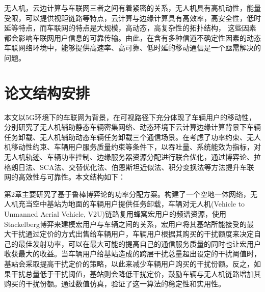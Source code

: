 \textcolor[RGB]{202,12,22}{}
无人机，云边计算与车联网三者之间有着紧密的关系，无人机具有高机动性，能量受限，可以提供视距链路等特点，云计算与边缘计算具有高效率，高安全性，低时延等特点，而车联网的特点是大规模，高动态，高复杂性的拓扑结构，
这些因素都会影响车联网用户信息的可靠传输。由此，在含有多种信道不确定性因素的动态车联网络环境中，能够提供高速率、高可靠、低时延的移动通信是一个亟需解决的问题。

\section{论文结构安排}\label{section1-4}
本文以5G环境下的车联网为背景，在可视路径下充分体现了车辆用户的移动性，分别研究了无人机辅助静态车辆密集网络、动态环境下云计算边缘计算背景下车辆任务卸载、无人机辅助动态车辆任务卸载三个通信场景。在考虑了功率约束、无人机移动性约束、车辆用户服务质量约束等条件下，以吞吐量、系统能效为指标，对无人机轨迹、车辆功率控制、边缘服务器资源分配进行联合优化，通过博弈论、拉格朗日法、SCA法、交替优化法、伯恩斯坦近似法、积分变换法等方法提升车联网的高效性与可靠性。本文结构如下：

第2章主要研究了基于鲁棒博弈论的功率分配方案。构建了一个空地一体网络，无人机充当空中基站为地面的车辆用户提供任务卸载，车辆对无人机(Vehicle to Unmanned Aerial Vehicle, V2U)链路复用蜂窝宏用户的频谱资源，使用Stackelberg博弈来建模宏用户与车辆之间的关系，宏用户将其基站所能接受的最大干扰通过定价的方式出售给车辆用户，车辆用户根据其购买的干扰额度来决定自己的最佳发射功率，可以在最大可能的提高自己的通信服务质量的同时也让宏用户收获最大的收益。当车辆用户给基站造成的跨层干扰总量超出设定的干扰阈值时，基站会采取提高干扰定价的策略，以此来减少车辆用户购买的干扰份额。反之，如果干扰总量低于干扰阈值，基站则会降低干扰定价，鼓励车辆与无人机链路增加其购买的干扰份额。通过数值仿真，验证了这一算法的稳定性和实用性。

